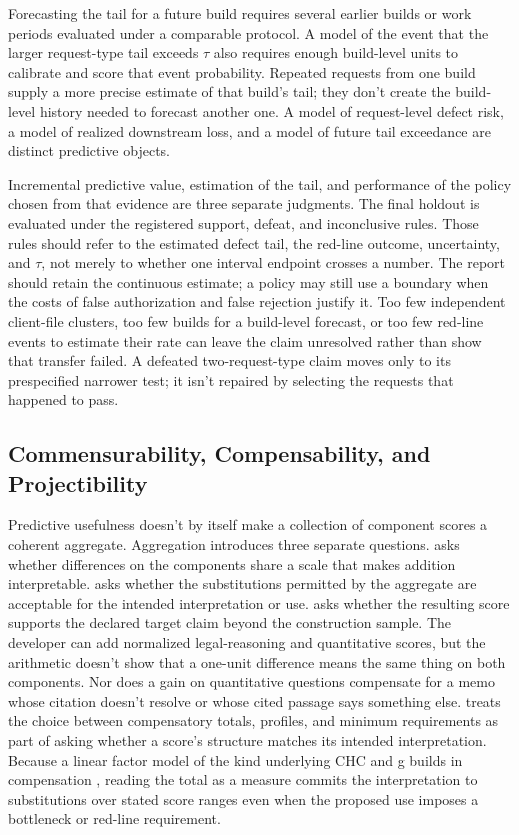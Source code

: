 \documentclass[12pt]{article}
\begin{document}
Forecasting the tail for a future build requires several earlier builds or work periods evaluated under a comparable protocol. A model of the event that the larger request-type tail exceeds \(\tau\) also requires enough build-level units to calibrate and score that event probability. Repeated requests from one build supply a more precise estimate of that build's tail; they don't create the build-level history needed to forecast another one. A model of request-level defect risk, a model of realized downstream loss, and a model of future tail exceedance are distinct predictive objects.

Incremental predictive value, estimation of the tail, and performance of the policy chosen from that evidence are three separate judgments. The final holdout is evaluated under the registered support, defeat, and inconclusive rules. Those rules should refer to the estimated defect tail, the red-line outcome, uncertainty, and \(\tau\), not merely to whether one interval endpoint crosses a number. The report should retain the continuous estimate; a policy may still use a boundary when the costs of false authorization and false rejection justify it. Too few independent client-file clusters, too few builds for a build-level forecast, or too few red-line events to estimate their rate can leave the claim unresolved rather than show that transfer failed. A defeated two-request-type claim moves only to its prespecified narrower test; it isn't repaired by selecting the requests that happened to pass.

\subsection{Commensurability, Compensability, and Projectibility}\label{ssec:score_model}

Predictive usefulness doesn't by itself make a collection of component scores a coherent aggregate. Aggregation introduces three separate questions.  asks whether differences on the components share a scale that makes addition interpretable.  asks whether the substitutions permitted by the aggregate are acceptable for the intended interpretation or use.  asks whether the resulting score supports the declared target claim beyond the construction sample. The developer can add normalized legal-reasoning and quantitative scores, but the arithmetic doesn't show that a one-unit difference means the same thing on both components. Nor does a gain on quantitative questions compensate for a memo whose citation doesn't resolve or whose cited passage says something else. \Textcite[745--747]{messick1995Validity} treats the choice between compensatory totals, profiles, and minimum requirements as part of asking whether a score's structure matches its intended interpretation. Because a linear factor model of the kind underlying CHC and g builds in compensation \citep[632]{carroll1993human}, reading the total as a measure commits the interpretation to substitutions over stated score ranges even when the proposed use imposes a bottleneck or red-line requirement.
\end{document}
